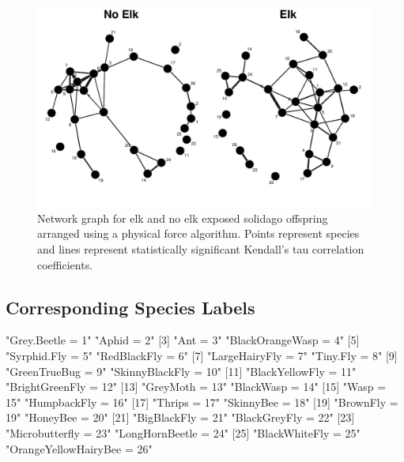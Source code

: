 \documentclass[11pt]{amsart}
\begin{document}
\begin{figure} 
\begin{center} 
\includegraphics{SPN_figures-net2}
\end{center} 
\caption{Network graph for elk and no elk exposed solidago offspring
  arranged using a physical force algorithm. Points represent species and lines represent
  statistically significant Kendall's tau correlation
  coefficients.} 
\label{fig:two}
\end{figure}

\subsection*{Corresponding Species Labels}
\begin{Schunk}
\begin{Soutput}
 [1] "Grey.Beetle = 1"           "Aphid = 2"                
 [3] "Ant = 3"                   "BlackOrangeWasp = 4"      
 [5] "Syrphid.Fly = 5"           "RedBlackFly = 6"          
 [7] "LargeHairyFly = 7"         "Tiny.Fly = 8"             
 [9] "GreenTrueBug = 9"          "SkinnyBlackFly = 10"      
[11] "BlackYellowFly = 11"       "BrightGreenFly = 12"      
[13] "GreyMoth = 13"             "BlackWasp = 14"           
[15] "Wasp = 15"                 "HumpbackFly = 16"         
[17] "Thrips = 17"               "SkinnyBee = 18"           
[19] "BrownFly = 19"             "HoneyBee = 20"            
[21] "BigBlackFly = 21"          "BlackGreyFly = 22"        
[23] "Microbutterfly = 23"       "LongHornBeetle = 24"      
[25] "BlackWhiteFly = 25"        "OrangeYellowHairyBee = 26"
\end{Soutput}
\end{Schunk}
\end{document}
